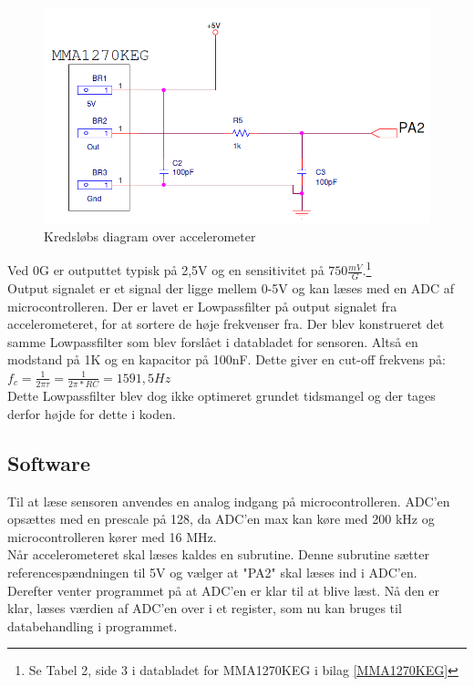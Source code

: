 \begin{figure}[h!]
\centering
\includegraphics[scale=0.6]{./Graphics/Accelerometer_diagram}
\caption{Kredsløbs diagram over accelerometer}
\label{diagram_acc}
\end{figure}

Ved 0G er outputtet typisk på 2,5V og en sensitivitet på $750\frac{mV}{G}$.\footnote{Se Tabel 2, side 3 i databladet for MMA1270KEG i bilag \ref{MMA1270KEG}} \\
Output signalet er et signal der ligge mellem 0-5V og kan læses med en ADC af microcontrolleren.
Der er lavet er Lowpassfilter på output signalet fra accelerometeret, for at sortere de høje frekvenser fra. Der blev konstrueret det samme Lowpassfilter som blev forslået i databladet for sensoren. Altså en modstand på 1K\ohm $ $ og en kapacitor på 100nF. Dette giver en cut-off frekvens på:\\$f_{c}=\frac{1}{2\pi\tau}=\frac{1}{2\pi*RC}=1591,5 Hz$\\
Dette Lowpassfilter blev dog ikke optimeret grundet tidsmangel og der tages derfor højde for dette i koden.\\

\subsection{Software}
Til at læse sensoren anvendes en analog indgang på microcontrolleren. ADC'en opsættes med en prescale på 128, da ADC'en max kan køre med 200 kHz og microcontrolleren kører med 16 MHz. \\
Når accelerometeret skal læses kaldes en subrutine. Denne subrutine sætter referencespændningen til 5V og vælger at "PA2" skal læses ind i ADC'en. Derefter venter programmet på at ADC'en er klar til at blive læst. Nå den er klar, læses værdien af ADC'en over i et register, som nu kan bruges til databehandling i programmet.\\

